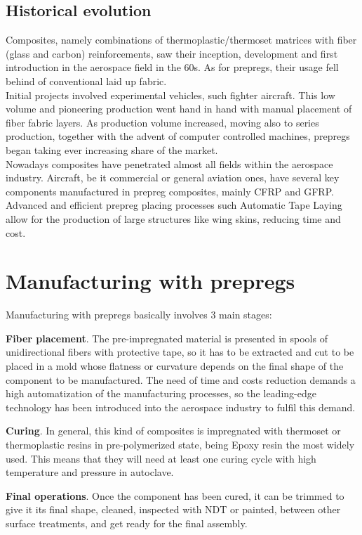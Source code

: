 \subsection{Historical evolution}

Composites, namely combinations of thermoplastic/thermoset matrices with fiber
(glass and carbon) reinforcements, saw their inception, development and first
introduction in the aerospace field in the 60s. As for prepregs, their usage fell
behind of conventional laid up fabric.\\

Initial projects involved experimental vehicles, such fighter aircraft. This low
volume and pioneering production went hand in hand with manual placement of fiber
fabric layers. As production volume increased, moving also to series production,
together with the advent of computer controlled machines, prepregs began taking
ever increasing share of the market.\\

Nowadays composites have penetrated almost all fields within the aerospace industry.
Aircraft, be it commercial or general aviation ones, have several key components
manufactured in prepreg composites, mainly CFRP and GFRP. Advanced and efficient
prepreg placing processes such Automatic Tape Laying allow for the production
of large structures like wing skins, reducing time and cost.\\


\section{Manufacturing with prepregs}


Manufacturing with prepregs basically involves 3 main stages:

\begin{numeration}
\item\textbf{Fiber placement}. The pre-impregnated material is presented in spools of unidirectional fibers with protective tape, so it has to be extracted and cut to be placed in a mold whose flatness or curvature depends on the final shape of the component to be manufactured. The need of time and costs reduction demands a high automatization of the manufacturing processes, so the leading-edge technology has been introduced into the aerospace industry to fulfil this demand.
\item\textbf{Curing}. In general, this kind of composites is impregnated with thermoset or thermoplastic resins in pre-polymerized state, being Epoxy resin the most widely used. This means that they will need at least one curing cycle with high temperature and pressure in autoclave.
\item\textbf{Final operations}. Once the component has been cured, it can be trimmed to give it its final shape, cleaned, inspected with NDT or painted, between other surface treatments, and get ready for the final assembly.
\end{numeration}

